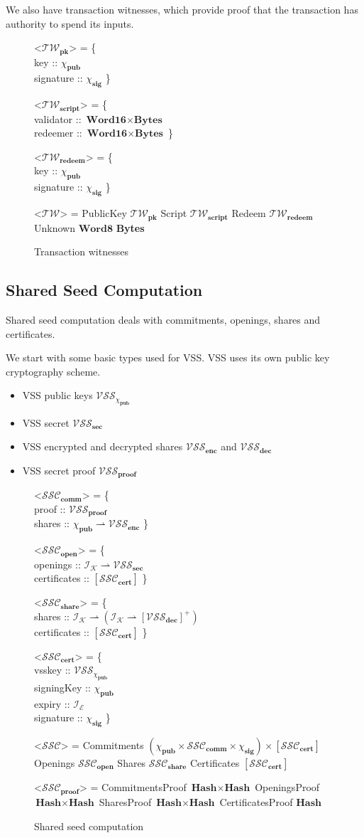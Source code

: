 \documentclass{article}
\def\fld{\\\llap{,\quad}}%
\newcommand{\rhu}{\rightharpoonup}
\newcommand{\lists}[1]{\left[{#1}\right]}
\newcommand{\nelists}[1]{\left[{#1}\right]^+}
\newcommand{\idsof}[1]{\mathcal{I}\!_#1}
\newcommand{\epochids}{\idsof{\mathcal{E}}}
\newcommand{\stakeholderids}{\idsof{\mathcal{K}}}
\newcommand{\pubkey}{\chi_{\textbf{pub}}}
\newcommand{\signature}{\chi_{\textbf{sig}}}
\newcommand{\vsspubkey}{\mathcal{VSS}_{\chi_{\textbf{pub}}}}
\newcommand{\vssproof}{\mathcal{VSS}_{\textbf{proof}}}
\newcommand{\vsssec}{\mathcal{VSS}_{\textbf{sec}}}
\newcommand{\vssencshare}{\mathcal{VSS}_{\textbf{enc}}}
\newcommand{\vssdecshare}{\mathcal{VSS}_{\textbf{dec}}}
\newcommand{\twit}{\mathcal{TW}}
\newcommand{\twitpk}{\twit_{\textbf{pk}}}
\newcommand{\twitscript}{\twit_{\textbf{script}}}
\newcommand{\twitredeem}{\twit_{\textbf{redeem}}}
\newcommand{\ssc}{\mathcal{SSC}}
\newcommand{\ssccomm}{\ssc_{\textbf{comm}}}
\newcommand{\sscopen}{\ssc_{\textbf{open}}}
\newcommand{\sscshare}{\ssc_{\textbf{share}}}
\newcommand{\ssccert}{\ssc_{\textbf{cert}}}
\newcommand{\sscpf}{\ssc_{\textbf{proof}}}
\newcommand{\hstype}[1]{\textbf{#1}}
\newcommand{\Word}[1]{\hstype{Word#1}}
\newcommand{\hash}{\hstype{Hash}}
\newcommand{\Bytes}{\hstype{Bytes}}
\begin{document}
We also have transaction witnesses, which provide proof that the transaction has
authority to spend its inputs.

\begin{figure}[H]
  \caption{Transaction witnesses}
  \begin{grammar}
    <$\twitpk$> = \{
    \fld key :: $\pubkey$
    \fld signature :: $\signature$
    \}

    <$\twitscript$> = \{
    \fld validator :: $\Word{16}\times\Bytes$
    \fld redeemer :: $\Word{16}\times\Bytes$
    \}

    <$\twitredeem$> = \{
    \fld key :: $\pubkey$
    \fld signature :: $\signature$
    \}

    <$\twit$> = PublicKey $\twitpk$
    \alt Script $\twitscript$
    \alt Redeem $\twitredeem$
    \alt Unknown $\Word{8}$ \Bytes
  \end{grammar}
\end{figure}

\subsection{Shared Seed Computation}

Shared seed computation deals with commitments, openings, shares and
certificates.

We start with some basic types used for VSS. VSS uses its own public key
cryptography scheme.

\begin{itemize}
\item VSS public keys $\vsspubkey$
\item VSS secret $\vsssec$
\item VSS encrypted and decrypted shares $\vssencshare$ and $\vssdecshare$
\item VSS secret proof $\vssproof$
\end{itemize}

\begin{figure}[H]
 \caption{Shared seed computation}
 \begin{grammar}
   <$\ssccomm$> = \{
   \fld proof :: $\vssproof$
   \fld shares :: $\pubkey \rhu \vssencshare$
   \}

   <$\sscopen$> = \{
   \fld openings :: $\stakeholderids \rhu \vsssec$
   \fld certificates :: $\lists{\ssccert}$
   \}

   <$\sscshare$> = \{
   \fld shares :: $\stakeholderids \rhu (\stakeholderids \rhu \nelists{\vssdecshare})$
   \fld certificates :: $\lists{\ssccert}$
   \}

   <$\ssccert$> = \{
   \fld vsskey :: $\vsspubkey$
   \fld signingKey :: $\pubkey$
   \fld expiry :: $\epochids$
   \fld signature :: $\signature$
   \}

   <$\ssc$> = Commitments $(\pubkey \times \ssccomm \times \signature)\times \lists{\ssccert}$
   \alt Openings $\sscopen$
   \alt Shares $\sscshare$
   \alt Certificates $\lists{\ssccert}$

   <$\sscpf$> = CommitmentsProof $\hash \times \hash$
   \alt OpeningsProof $\hash \times \hash$
   \alt SharesProof $\hash \times \hash$
   \alt CertificatesProof $\hash$
 \end{grammar}
\end{figure}
\end{document}
